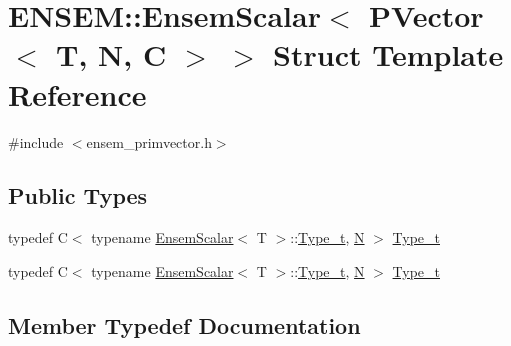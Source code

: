 \hypertarget{structENSEM_1_1EnsemScalar_3_01PVector_3_01T_00_01N_00_01C_01_4_01_4}{}\section{E\+N\+S\+EM\+:\+:Ensem\+Scalar$<$ P\+Vector$<$ T, N, C $>$ $>$ Struct Template Reference}
\label{structENSEM_1_1EnsemScalar_3_01PVector_3_01T_00_01N_00_01C_01_4_01_4}


{\ttfamily \#include $<$ensem\+\_\+primvector.\+h$>$}

\subsection*{Public Types}
\begin{DoxyCompactItemize}
\item 
typedef C$<$ typename \mbox{\hyperlink{structENSEM_1_1EnsemScalar}{Ensem\+Scalar}}$<$ T $>$\+::\mbox{\hyperlink{structENSEM_1_1EnsemScalar_3_01PVector_3_01T_00_01N_00_01C_01_4_01_4_a7301e4986b6b626a7c41055ad178ffac}{Type\+\_\+t}}, \mbox{\hyperlink{operator__name__util_8cc_a7722c8ecbb62d99aee7ce68b1752f337}{N}} $>$ \mbox{\hyperlink{structENSEM_1_1EnsemScalar_3_01PVector_3_01T_00_01N_00_01C_01_4_01_4_a7301e4986b6b626a7c41055ad178ffac}{Type\+\_\+t}}
\item 
typedef C$<$ typename \mbox{\hyperlink{structENSEM_1_1EnsemScalar}{Ensem\+Scalar}}$<$ T $>$\+::\mbox{\hyperlink{structENSEM_1_1EnsemScalar_3_01PVector_3_01T_00_01N_00_01C_01_4_01_4_a7301e4986b6b626a7c41055ad178ffac}{Type\+\_\+t}}, \mbox{\hyperlink{operator__name__util_8cc_a7722c8ecbb62d99aee7ce68b1752f337}{N}} $>$ \mbox{\hyperlink{structENSEM_1_1EnsemScalar_3_01PVector_3_01T_00_01N_00_01C_01_4_01_4_a7301e4986b6b626a7c41055ad178ffac}{Type\+\_\+t}}
\end{DoxyCompactItemize}


\subsection{Member Typedef Documentation}
\mbox{\label{structENSEM_1_1EnsemScalar_3_01PVector_3_01T_00_01N_00_01C_01_4_01_4_a7301e4986b6b626a7c41055ad178ffac}} 
